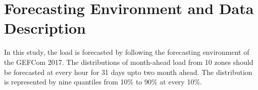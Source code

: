 \documentclass[journal]{IEEEtran} %
\begin{document}




\section{Forecasting Environment and Data Description}

In this study, the load is forecasted by following the forecasting environment of the GEFCom 2017. The distributions of month-ahead load from 10 zones should be forecasted at every hour for 31 days upto two month ahead. The distribution is represented by nine quantiles from 10\% to 90\% at every 10\%. 
\end{document}
